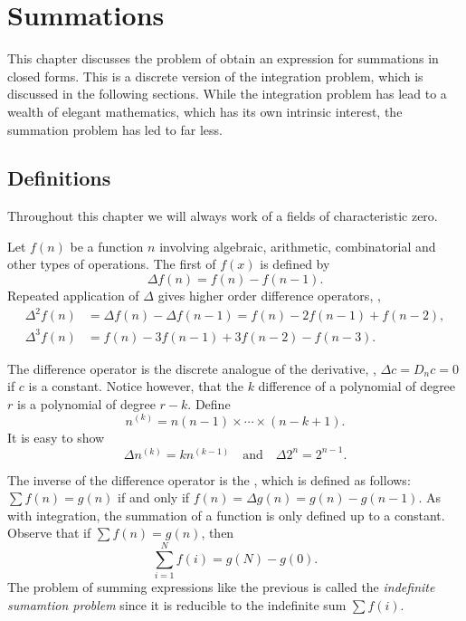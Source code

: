 \chapter{Summations}
\label{Sum:Chap}

This chapter discusses the problem of obtain an expression for
summations in closed forms.  This is a discrete version of the
integration problem, which is discussed in the following sections.
While the integration problem has lead to a wealth of elegant
mathematics, which has its own intrinsic interest, the summation
problem has led to far less.

\section{Definitions}

Throughout this chapter we will always work of a fields of
characteristic zero.  

Let $f(n)$ be a function $n$ involving algebraic, arithmetic,
combinatorial and other types of operations.  The first
 of $f(x)$ is defined by 
\[
\Delta f(n) = f(n) - f(n-1).
\]
Repeated application of $\Delta$ gives higher order difference
operators, \eg,
\[
\begin {aligned}
\Delta^2 f(n) &= \Delta f(n) - \Delta f(n-1) = f(n) - 2 f(n-1) +
f(n-2), \\
\Delta^3 f(n) & = f(n) - 3 f(n-1) + 3 f(n-2) - f(n-3).
\end{aligned}
\]

The difference operator is the discrete analogue of the derivative,
\eg,  $\Delta c = D_n c = 0$ if $c$ is a constant.  Notice however,
that the $k${\th} difference of a polynomial of degree $r$ is a
polynomial of degree $r-k$.  Define
\[
n^{(k)} = n (n-1) \times \cdots \times (n - k + 1). 
\]
It is easy to show
\[
\Delta n^{(k)} = k n^{(k-1)}\quad\mbox{and}\quad
\Delta 2^n = 2^{n-1}.
\]

The inverse of the difference operator is the , which is defined as follows: $\sum f(n) = g(n)$ if and only
if $f(n) = \Delta g(n) = g(n) - g(n-1)$.  As with integration, the
summation of a function is only defined up to a constant.  Observe
that if $\sum f(n) = g(n)$, then
\[
\sum_{i=1}^{N} f(i) = g(N) - g(0).
\]
The problem of summing expressions like the previous is called the
{\em indefinite sumamtion problem} since it is reducible to the
indefinite sum $\sum f(i)$.

